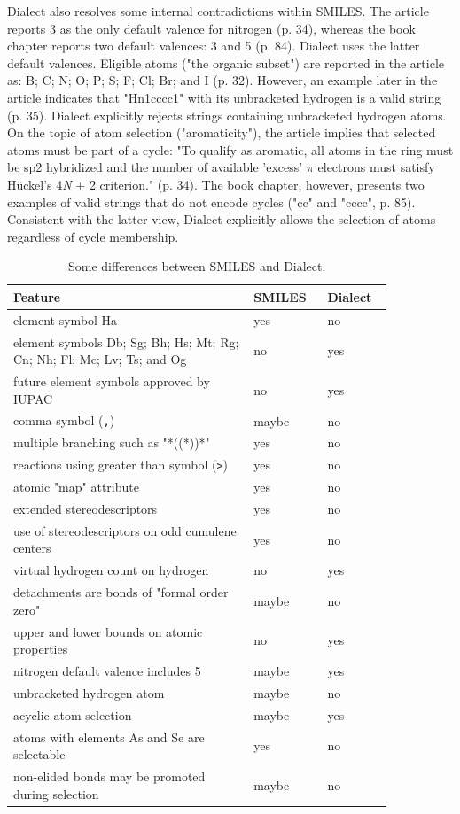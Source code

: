 \documentclass{article}
\def\ttt{\texttt}
\begin{document}
Dialect also resolves some internal contradictions within SMILES. The article reports 3 as the only default valence for nitrogen (p. 34), whereas the book chapter reports two default valences: 3 and 5 (p. 84). Dialect uses the latter default valences. Eligible atoms ("the organic subset") are reported in the article as: B; C; N; O; P; S; F; Cl; Br; and I (p. 32). However, an example later in the article indicates that "Hn1cccc1" with its unbracketed hydrogen is a valid string (p. 35). Dialect explicitly rejects strings containing unbracketed hydrogen atoms. On the topic of atom selection ("aromaticity"), the article implies that selected atoms must be part of a cycle: "To qualify as aromatic, all atoms in the ring must be sp2 hybridized and the number of available 'excess' $\pi$ electrons must satisfy Hückel's 4{\textit{N}} + 2 criterion." (p. 34). The book chapter, however, presents two examples of valid strings that do not encode cycles ("cc" and "cccc", p. 85). Consistent with the latter view, Dialect explicitly allows the selection of atoms regardless of cycle membership.

\begin{table}
    \caption{Some differences between SMILES and Dialect.}
    \centering
    \begin{tabular}{p{0.55\linewidth} p{0.15\linewidth} p{0.15\linewidth}}
        \hline
        Feature & SMILES & Dialect \\
        \hline
        element symbol Ha & yes & no \\
        element symbols Db; Sg; Bh; Hs; Mt; Rg; Cn; Nh; Fl; Mc; Lv; Ts; and Og & no & yes \\
        future element symbols approved by IUPAC & no & yes \\
        comma symbol (\ttt{,}) & maybe & no \\
        multiple branching such as "*((*))*" & yes & no \\
        reactions using greater than symbol (\ttt{>}) & yes & no \\
        atomic "map" attribute & yes & no \\
        extended stereodescriptors & yes & no \\
        use of stereodescriptors on odd cumulene centers & yes & no \\
        virtual hydrogen count on hydrogen & no & yes \\
        detachments are bonds of "formal order zero" & maybe & no \\
        upper and lower bounds on atomic properties & no & yes \\
        nitrogen default valence includes 5 & maybe & yes \\
        unbracketed hydrogen atom & maybe & no \\
        acyclic atom selection & maybe & yes \\
        atoms with elements As and Se are selectable & yes & no \\
        non-elided bonds may be promoted during selection & maybe & no \\
        \hline
    \end{tabular}
    \label{table:feature-comparison}
\end{table}
\end{document}
